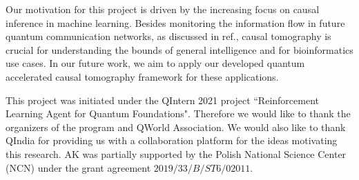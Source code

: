 \documentclass[%
 aps,
 jmp,%
 amsmath,amssymb,
 reprint,%
]{revtex4-2}
\begin{document}
Our motivation for this project is driven by the increasing focus on causal inference in machine learning.
Besides monitoring the information flow in future quantum communication networks, as discussed in ref.\cite{chiribella2019quantum}, causal tomography is crucial for understanding the bounds of general intelligence and for bioinformatics use cases.
In our future work, we aim to apply our developed quantum accelerated causal tomography framework for these applications.

\begin{acknowledgments}
This project was initiated under the QIntern 2021 project ``Reinforcement Learning Agent for Quantum Foundations".
Therefore we would like to thank the organizers of the program and QWorld Association. 
We would also like to thank QIndia for providing us with a collaboration platform for the ideas motivating this research.
AK was partially supported by the Polish National Science Center (NCN) under the grant agreement $2019/33/B/ST6/02011$.
\end{acknowledgments}

\appendix



\nocite{*}
\end{document}
